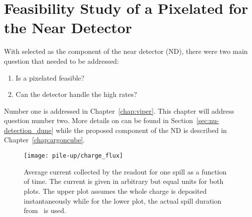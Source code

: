 \chapter{Feasibility Study of a Pixelated \lartpc{} for the \dune{} Near Detector}
\label{chap:dune-nd}


With \AC{} selected as  the \lar{} component of the \dune{} near detector (ND), there were two main question that needed to be addressed:
\begin{enumerate}
	\item Is a pixelated \lartpc{} feasible?
	\item Can the \lar{} detector handle the high rates?
\end{enumerate}
Number one is addressed in Chapter~\ref{chap:viper}.
This chapter will address question number two.
More details on \dune{} can be found in Section~\ref{sec:nu-detection_dune} while the proposed \AC{} \lar{} component of the ND is described in Chapter~\ref{chap:argoncube}.

\begin{figure}[htb]
	\centering
	\texttt{[image: pile-up/charge\_flux]}
	\caption{Average current collected by the readout for one spill as a function of time.
	The current is given in arbitrary but equal units for both plots.
	The upper plot assumes the whole charge is deposited instantaneously while for the lower plot, the actual spill duration from~\cite{dune2} is used.}
	\label{fig:dune-nd_charge-flux}
\end{figure}

